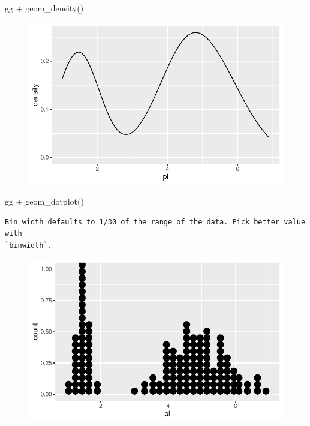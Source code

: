 \documentclass[
  letterpaper,
  DIV=11,
  numbers=noendperiod]{scrreprt}
\newenvironment{Shaded}{\begin{snugshade}}{\end{snugshade}}
\newcommand{\FunctionTok}[1]{\textcolor[rgb]{0.28,0.35,0.67}{#1}}
\newcommand{\NormalTok}[1]{\textcolor[rgb]{0.00,0.23,0.31}{#1}}
\newcommand{\SpecialCharTok}[1]{\textcolor[rgb]{0.37,0.37,0.37}{#1}}
\begin{document}
\begin{Shaded}
\begin{Highlighting}[]
\NormalTok{gg }\SpecialCharTok{+} \FunctionTok{geom\_density}\NormalTok{()}
\end{Highlighting}
\end{Shaded}

\begin{figure}[H]

{\centering \includegraphics{ggplot2_files/figure-pdf/unnamed-chunk-24-2.pdf}

}

\end{figure}

\begin{Shaded}
\begin{Highlighting}[]
\NormalTok{gg }\SpecialCharTok{+} \FunctionTok{geom\_dotplot}\NormalTok{()}
\end{Highlighting}
\end{Shaded}

\begin{verbatim}
Bin width defaults to 1/30 of the range of the data. Pick better value with
`binwidth`.
\end{verbatim}

\begin{figure}[H]

{\centering \includegraphics{ggplot2_files/figure-pdf/unnamed-chunk-24-3.pdf}

}

\end{figure}
\end{document}
